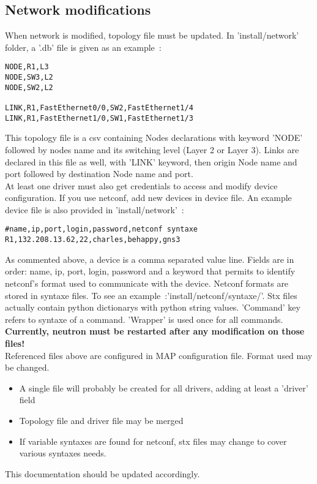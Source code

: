 \subsection{Network modifications}
When network is modified, topology file must be updated. In 'install/network'
folder, a '.db' file is given as an example~:
\begin{verbatim}
NODE,R1,L3
NODE,SW3,L2
NODE,SW2,L2

LINK,R1,FastEthernet0/0,SW2,FastEthernet1/4
LINK,R1,FastEthernet1/0,SW1,FastEthernet1/3
\end{verbatim}
This topology file is a csv containing Nodes declarations with keyword 'NODE'
followed by nodes name and its switching level (Layer 2 or Layer 3). Links are
declared in this file as well, with 'LINK' keyword, then
origin Node name and port followed by destination Node name and port.\\
At least one driver must also get credentials to access and modify device
configuration. If you use netconf, add new devices in device file. An example
device file is also provided in 'install/network'~:
\begin{verbatim}
#name,ip,port,login,password,netconf syntaxe
R1,132.208.13.62,22,charles,behappy,gns3
\end{verbatim}
As commented above, a device is a comma separated value line. Fields are in order:
name, ip, port, login, password and a keyword that permits to identify netconf's
format used to communicate with the device. Netconf formats are stored in
syntaxe files. To see an example~:'install/netconf/syntaxe/'. Stx files actually
contain python dictionarys with python string values. 'Command' key refers to
syntaxe of a command. 'Wrapper' is used once for all commands.\\
\textbf{Currently, neutron must be restarted after any modification on those
files!}\\[1\baselineskip] Referenced files above are configured in MAP configuration file. Format used
may be changed.
\begin{itemize}
    \item A single file will probably be created for all drivers, adding at
    least a 'driver' field
    \item Topology file and driver file may be merged
    \item If variable syntaxes are found for netconf, stx files may change to
    cover various syntaxes needs.
\end{itemize}
This documentation should be updated accordingly.


